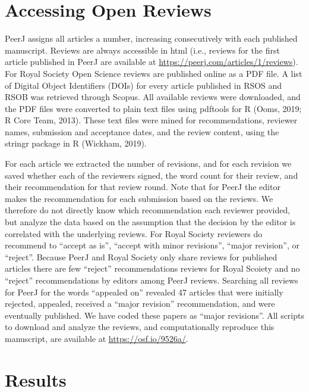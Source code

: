 \documentclass[,jou, a4paper,floatsintext]{apa6}
\begin{document}
\hypertarget{accessing-open-reviews}{%
\section{Accessing Open Reviews}\label{accessing-open-reviews}}

PeerJ assigns all articles a number, increasing consecutively with each published manuscript. Reviews are always accessible in html (i.e., reviews for the first article published in PeerJ are available at \url{https://peerj.com/articles/1/reviews}). For Royal Society Open Science reviews are published online as a PDF file. A list of Digital Object Identifiers (DOIs) for every article published in RSOS and RSOB was retrieved through Scopus. All available reviews were downloaded, and the PDF files were converted to plain text files using pdftools for R (Ooms, 2019; R Core Team, 2013). These text files were mined for recommendations, reviewer names, submission and acceptance dates, and the review content, using the stringr package in R (Wickham, 2019).

For each article we extracted the number of revisions, and for each revision we saved whether each of the reviewers signed, the word count for their review, and their recommendation for that review round. Note that for PeerJ the editor makes the recommendation for each submission based on the reviews. We therefore do not directly know which recommendation each reviewer provided, but analyze the data based on the assumption that the decision by the editor is correlated with the underlying reviews. For Royal Society reviewers do recommend to \enquote{accept as is}, \enquote{accept with minor revisions}, \enquote{major revision}, or \enquote{reject}. Because PeerJ and Royal Society only share reviews for published articles there are few \enquote{reject} recommendations reviews for Royal Scoiety and no \enquote{reject} recommendations by editors among PeerJ reviews. Searching all reviews for PeerJ for the words \enquote{appealed on} revealed 47 articles that were initially rejected, appealed, received a \enquote{major revision} recommendation, and were eventually published. We have coded these papers as \enquote{major revisions}. All scripts to download and analyze the reviews, and computationally reproduce this manuscript, are available at \url{https://osf.io/9526a/}.

\hypertarget{results}{%
\section{Results}\label{results}}
\end{document}
